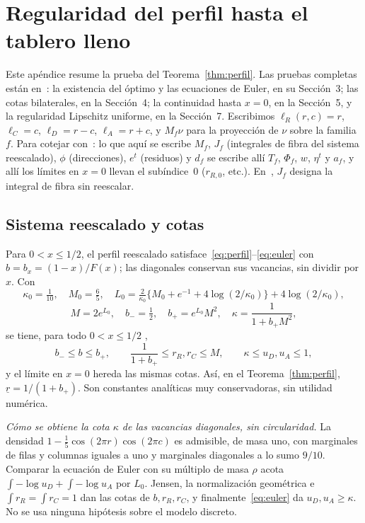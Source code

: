 \section{Regularidad del perfil hasta el tablero lleno}\label{app:perfil}

Este apéndice resume la prueba del Teorema~\ref{thm:perfil}. Las pruebas completas están
en~\cite{Perfil}: la existencia del óptimo y las ecuaciones de Euler, en su Sección~3; las cotas
bilaterales, en la Sección~4; la continuidad hasta $x=0$, en la Sección~5, y la regularidad
Lipschitz uniforme, en la Sección~7. Escribimos $\ell_R(r,c)=r$, $\ell_C=c$,
$\ell_D=r-c$, $\ell_A=r+c$, y $M_f\nu$ para la proyección de $\nu$ sobre la familia $f$.
Para cotejar con~\cite{Perfil}: lo que aquí se escribe $M_f$, $J_f$ (integrales de fibra del
sistema reescalado), $\phi$ (direcciones), $e^t$ (residuos) y $d_f$ se escribe allí $T_f$,
$\Phi_f$, $w$, $\eta^t$ y $a_f$, y allí los límites en $x=0$ llevan el subíndice~$0$
($r_{R,0}$, etc.). En~\cite{Perfil}, $J_f$ designa la integral de fibra sin reescalar.

\subsection{Sistema reescalado y cotas}

Para $0<x\le1/2$, el perfil reescalado satisface~\eqref{eq:perfil}--\eqref{eq:euler} con
$b=b_x=(1-x)/F(x)$; las diagonales conservan sus vacancias, sin dividir por $x$. Con
\[
 \kappa_0=\tfrac1{10},\quad M_0=\tfrac65,\quad
 L_0=\tfrac2{\kappa_0}\bigl\{M_0+e^{-1}+4\log(2/\kappa_0)\bigr\}+4\log(2/\kappa_0),
\]
\[
 M=2e^{L_0},\quad b_-=\tfrac12,\quad b_+=e^{L_0}M^2,\quad \kappa=\frac1{1+b_+M^2},
\]
se tiene, para todo $0<x\le1/2$ \cite[Proposición~4.2]{Perfil},
\begin{equation}\label{eq:cotas_perfil}
 b_-\le b\le b_+,\qquad \frac1{1+b_+}\le r_R,r_C\le M,\qquad \kappa\le u_D,u_A\le1,
\end{equation}
y el límite en $x=0$ hereda las mismas cotas. Así, en el Teorema~\ref{thm:perfil},
$\underline r=1/(1+b_+)$. Son constantes analíticas muy conservadoras, sin utilidad numérica.

\emph{Cómo se obtiene la cota $\kappa$ de las vacancias diagonales, sin circularidad.} La densidad
$1-\frac15\cos(2\pi r)\cos(2\pi c)$ es admisible, de masa uno, con marginales de filas y columnas
iguales a uno y marginales diagonales a lo sumo $9/10$. Comparar la ecuación de Euler con su
múltiplo de masa $\rho$ acota $\int-\log u_D+\int-\log u_A$ por $L_0$. Jensen, la normalización
geométrica e $\int r_R=\int r_C=1$ dan las cotas de $b,r_R,r_C$, y finalmente~\eqref{eq:euler}
da $u_D,u_A\ge\kappa$. No se usa ninguna hipótesis sobre el modelo discreto.

